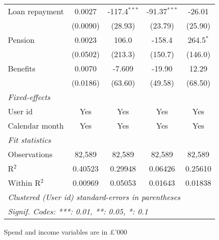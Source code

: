 \begin{table}[htbp]
\begin{threeparttable}[b]
\begin{tabular}{lcccc}
         Loan repayment         & 0.0027             & -117.4$^{***}$ & -91.37$^{***}$ & -26.01\\   
                                & (0.0090)           & (28.93)        & (23.79)        & (25.90)\\   
         Pension                & 0.0023             & 106.0          & -158.4         & 264.5$^{*}$\\   
                                & (0.0502)           & (213.3)        & (150.7)        & (146.0)\\   
         Benefits               & 0.0070             & -7.609         & -19.90         & 12.29\\   
                                & (0.0186)           & (63.60)        & (49.58)        & (68.50)\\   
         \midrule
         \emph{Fixed-effects}\\
         User id                & Yes                & Yes            & Yes            & Yes\\  
         Calendar month         & Yes                & Yes            & Yes            & Yes\\  
         \midrule
         \emph{Fit statistics}\\
         Observations           & 82,589             & 82,589         & 82,589         & 82,589\\  
         R$^2$                  & 0.40523            & 0.29948        & 0.06426        & 0.25610\\  
         Within R$^2$           & 0.00969            & 0.05053        & 0.01643        & 0.01838\\  
         \midrule \midrule
         \multicolumn{5}{l}{\emph{Clustered (User id) standard-errors in parentheses}}\\
         \multicolumn{5}{l}{\emph{Signif. Codes: ***: 0.01, **: 0.05, *: 0.1}}\\
      \end{tabular}
      
      \begin{tablenotes}\footnotesize
         \item Spend and income variables are in \pounds'000
      \end{tablenotes}
   \end{threeparttable}
\end{table}


